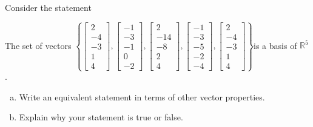 
\begin{exerciseStatement}


Consider the statement 
\begin{center}\begin{minipage}{0.8\textwidth}
 The set of vectors \( \left\{ \left[\begin{array}{c}
2 \\
-4 \\
-3 \\
1 \\
4
\end{array}\right] , \left[\begin{array}{c}
-1 \\
-3 \\
-1 \\
0 \\
-2
\end{array}\right] , \left[\begin{array}{c}
2 \\
-14 \\
-8 \\
2 \\
4
\end{array}\right] , \left[\begin{array}{c}
-1 \\
-3 \\
-5 \\
-2 \\
-4
\end{array}\right] , \left[\begin{array}{c}
2 \\
-4 \\
-3 \\
1 \\
4
\end{array}\right] \right\} \)is a basis of \(\mathbb{R}^5\). 
\end{minipage}\end{center}
    


\begin{enumerate}[(a)]
\item  Write an equivalent statement in terms of other vector properties.
\item  Explain why your statement is true or false.
\end{enumerate}
    
\end{exerciseStatement}
    
